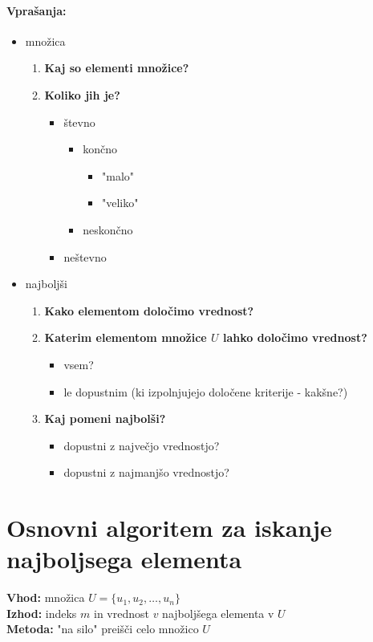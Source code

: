 \documentclass[a4paper,10pt]{article}
\begin{document}
\paragraph{Vpra\v sanja:}
\begin{itemize}
\item mno\v zica
	\begin{enumerate}
	\item \textbf{Kaj so elementi mno\v zice?}
	\item \textbf{Koliko jih je?}
		\begin{itemize}
		\item \v stevno
			\begin{itemize}
			\item kon\v cno
				\begin{itemize}
				\item "malo"
				\item "veliko"
				\end{itemize}
			\item neskon\v cno
			\end{itemize}
		\item ne\v stevno
		\end{itemize}
	\end{enumerate}
\item najbolj\v si
	\begin{enumerate}
	\item \textbf{Kako elementom dolo\v cimo vrednost?}
	\item \textbf{Katerim elementom mno\v zice $U$ lahko dolo\v cimo vrednost?}
		\begin{itemize}
		\item vsem?
		\item le dopustnim (ki izpolnjujejo dolo\v cene kriterije - kak\v sne?)
		\end{itemize}
	\item \textbf{Kaj pomeni najbol\v si?}
		\begin{itemize}
		\item dopustni z najve\v cjo vrednostjo?
		\item dopustni z najmanj\v so vrednostjo?
		\end{itemize}
	\end{enumerate}
\end{itemize}


\section{Osnovni algoritem za iskanje najboljsega elementa}
\begin{flushleft}
\textbf{Vhod:} mno\v zica $U = \{u_1,u_2,\dots,u_n\}$ \\
\textbf{Izhod:} indeks $m$ in vrednost $v$ najbolj\v sega elementa v $U$ \\
\textbf{Metoda:} "na silo" prei\v s\v ci celo mno\v zico $U$ \\
\end{flushleft}
\end{document}
